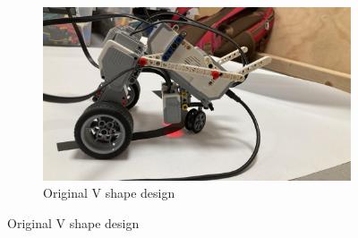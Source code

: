 \documentclass{article}
\begin{document}
\begin{figure}[!htbp]
	\centering

	\begin{subfigure}{0.8\textwidth}
		\includegraphics[width=\textwidth]{./figures/old-v-shape.jpeg}
		\caption{Original V shape design}
	\end{subfigure}

	\vspace{\baselineskip}


\end{figure}
\end{document}
